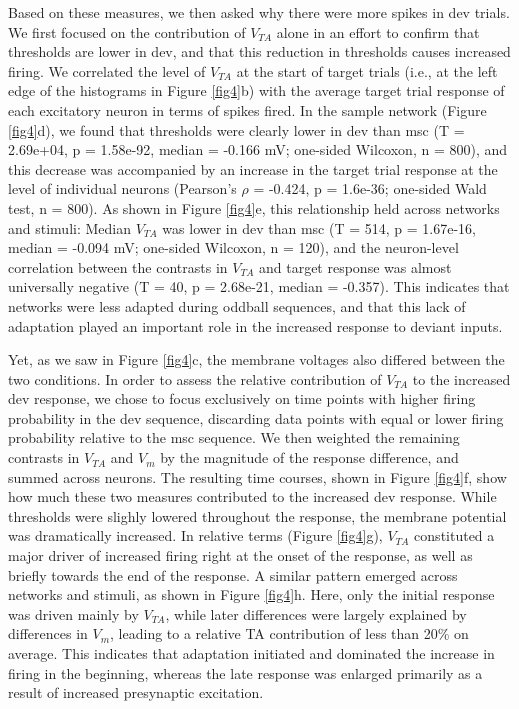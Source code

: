 \documentclass[pdflatex,referee,iicol,sn-basic]{sn-jnl}
\theoremstyle{thmstyleone}%
\theoremstyle{thmstyletwo}%
\theoremstyle{thmstylethree}%
\begin{document}
Based on these measures, we then asked why there were more spikes in dev trials. We first focused on the contribution of $V_{TA}$ alone in an effort to confirm that thresholds are lower in dev, and that this reduction in thresholds causes increased firing. We correlated the level of $V_{TA}$ at the start of target trials (i.e., at the left edge of the histograms in Figure \ref{fig4}b) with the average target trial response of each excitatory neuron in terms of spikes fired. In the sample network (Figure \ref{fig4}d), we found that thresholds were clearly lower in dev than msc (T = 2.69e+04, p = 1.58e-92, median = -0.166 mV; one-sided Wilcoxon, n = 800), and this decrease was accompanied by an increase in the target trial response at the level of individual neurons (Pearson's $\rho$ = -0.424, p = 1.6e-36; one-sided Wald test, n = 800). As shown in Figure \ref{fig4}e, this relationship held across networks and stimuli: Median $V_{TA}$ was lower in dev than msc (T = 514, p = 1.67e-16, median = -0.094 mV; one-sided Wilcoxon, n = 120), and the neuron-level correlation between the contrasts in $V_{TA}$ and target response was almost universally negative (T = 40, p = 2.68e-21, median = -0.357). This indicates that networks were less adapted during oddball sequences, and that this lack of adaptation played an important role in the increased response to deviant inputs.

Yet, as we saw in Figure \ref{fig4}c, the membrane voltages also differed between the two conditions. In order to assess the relative contribution of $V_{TA}$ to the increased dev response, we chose to focus exclusively on time points with higher firing probability in the dev sequence, discarding data points with equal or lower firing probability relative to the msc sequence. We then weighted the remaining contrasts in $V_{TA}$ and $V_m$ by the magnitude of the response difference, and summed across neurons. The resulting time courses, shown in Figure \ref{fig4}f, show how much these two measures contributed to the increased dev response. While thresholds were slighly lowered throughout the response, the membrane potential was dramatically increased. In relative terms (Figure \ref{fig4}g), $V_{TA}$ constituted a major driver of increased firing right at the onset of the response, as well as briefly towards the end of the response. A similar pattern emerged across networks and stimuli, as shown in Figure \ref{fig4}h. Here, only the initial response was driven mainly by $V_{TA}$, while later differences were largely explained by differences in $V_m$, leading to a relative TA contribution of less than 20\% on average. This indicates that adaptation initiated and dominated the increase in firing in the beginning, whereas the late response was enlarged primarily as a result of increased presynaptic excitation.
\end{document}
